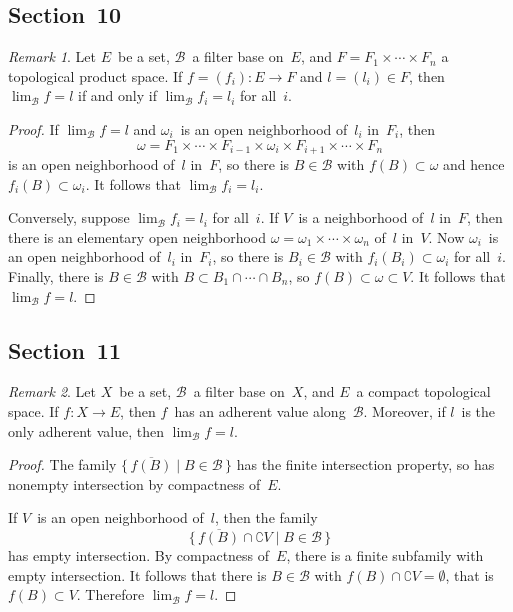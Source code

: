 \documentclass[letterpaper,12pt]{article}
\newcommand{\B}{\mathcal{B}}
\newcommand{\sect}{\cap}
\newcommand{\closure}[1]{\overline{#1}}
\theoremstyle{definition}
\theoremstyle{remark}
\newtheorem*{rmk}{Remark}
\begin{document}
\subsection*{Section~10}
\begin{rmk}
Let \(E\)~be a set, \(\B\)~a filter base on~\(E\), and \(F=F_1\times\cdots\times F_n\) a topological product space. If \(f=(f_i):E\to F\) and \(l=(l_i)\in F\), then \(\lim_{\B}f=l\) if and only if \(\lim_{\B}f_i=l_i\) for all~\(i\).
\end{rmk}
\begin{proof}
If \(\lim_{\B}f=l\) and \(\omega_i\)~is an open neighborhood of~\(l_i\) in~\(F_i\), then
\[\omega=F_1\times\cdots\times F_{i-1}\times\omega_i\times F_{i+1}\times\cdots\times F_n\]
is an open neighborhood of~\(l\) in~\(F\), so there is \(B\in\B\) with \(f(B)\subset\omega\) and hence \(f_i(B)\subset\omega_i\). It follows that \(\lim_{\B}f_i=l_i\).

Conversely, suppose \(\lim_{\B}f_i=l_i\) for all~\(i\). If \(V\)~is a neighborhood of~\(l\) in~\(F\), then there is an elementary open neighborhood \(\omega=\omega_1\times\cdots\times\omega_n\) of~\(l\) in~\(V\). Now \(\omega_i\)~is an open neighborhood of~\(l_i\) in~\(F_i\), so there is \(B_i\in\B\) with \(f_i(B_i)\subset\omega_i\) for all~\(i\). Finally, there is \(B\in\B\) with \(B\subset B_1\sect\cdots\sect B_n\), so \(f(B)\subset\omega\subset V\). It follows that \(\lim_{\B}f=l\).
\end{proof}

\subsection*{Section~11}
\begin{rmk}
Let \(X\)~be a set, \(\B\)~a filter base on~\(X\), and \(E\)~a compact topological space. If \(f:X\to E\), then \(f\)~has an adherent value along~\(\B\). Moreover, if \(l\)~is the only adherent value, then \(\lim_{\B}f=l\).
\end{rmk}
\begin{proof}
The family \(\{\,\closure{f(B)}\mid B\in\B\,\}\) has the finite intersection property, so has nonempty intersection by compactness of~\(E\).

If \(V\)~is an open neighborhood of~\(l\), then the family
\[\{\,\closure{f(B)}\sect\complement V\mid B\in\B\,\}\]
has empty intersection. By compactness of~\(E\), there is a finite subfamily with empty intersection. It follows that there is \(B\in\B\) with \(f(B)\sect\complement V=\emptyset\), that is \(f(B)\subset V\). Therefore \(\lim_{\B}f=l\).
\end{proof}
\end{document}
